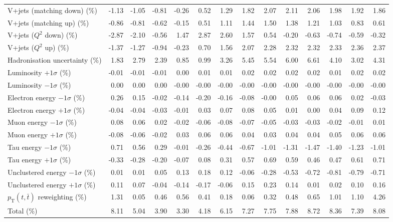 \begin{table}[htbp]
{\begin{tabular}{lrrrrrrrrrrrrr}
V+jets (matching down) (\%) & -1.13 & -1.05 & -0.81 & -0.26 & 0.52 & 1.29 & 1.82 & 2.07 & 2.11 & 2.06 & 1.98 & 1.92 & 1.86 \\ 
V+jets (matching up) (\%) & -0.86 & -0.81 & -0.62 & -0.15 & 0.51 & 1.11 & 1.44 & 1.50 & 1.38 & 1.21 & 1.03 & 0.83 & 0.61 \\ 
V+jets ($Q^{2}$ down) (\%) & -2.87 & -2.10 & -0.56 & 1.47 & 2.87 & 2.60 & 1.57 & 0.54 & -0.20 & -0.63 & -0.74 & -0.59 & -0.32 \\ 
V+jets ($Q^{2}$ up) (\%) & -1.37 & -1.27 & -0.94 & -0.23 & 0.70 & 1.56 & 2.07 & 2.28 & 2.32 & 2.32 & 2.33 & 2.36 & 2.37 \\ 
Hadronisation uncertainty (\%) & 1.83 & 2.79 & 2.39 & 0.85 & 0.99 & 3.26 & 5.45 & 5.54 & 6.00 & 6.61 & 4.10 & 3.02 & 4.31 \\ 
Luminosity $+1\sigma$ (\%) & -0.01 & -0.01 & -0.01 & 0.00 & 0.01 & 0.01 & 0.02 & 0.02 & 0.02 & 0.02 & 0.01 & 0.02 & 0.02 \\ 
Luminosity $-1\sigma$ (\%) & 0.00 & 0.00 & 0.00 & -0.00 & -0.00 & -0.00 & -0.00 & -0.00 & -0.00 & -0.00 & -0.00 & -0.00 & -0.00 \\ 
Electron energy $-1\sigma$ (\%) & 0.26 & 0.15 & -0.02 & -0.14 & -0.20 & -0.16 & -0.08 & -0.00 & 0.05 & 0.06 & 0.06 & 0.02 & -0.03 \\ 
Electron energy $+1\sigma$ (\%) & -0.04 & -0.04 & -0.03 & -0.01 & 0.03 & 0.07 & 0.08 & 0.05 & 0.01 & 0.00 & 0.04 & 0.09 & 0.12 \\ 
Muon energy $-1\sigma$ (\%) & 0.08 & 0.06 & 0.02 & -0.02 & -0.06 & -0.08 & -0.07 & -0.05 & -0.03 & -0.03 & -0.02 & -0.01 & 0.01 \\ 
Muon energy $+1\sigma$ (\%) & -0.08 & -0.06 & -0.02 & 0.03 & 0.06 & 0.06 & 0.04 & 0.03 & 0.04 & 0.04 & 0.05 & 0.06 & 0.06 \\ 
Tau energy $-1\sigma$ (\%) & 0.71 & 0.56 & 0.29 & -0.01 & -0.26 & -0.44 & -0.67 & -1.01 & -1.31 & -1.47 & -1.40 & -1.23 & -1.01 \\ 
Tau energy $+1\sigma$ (\%) & -0.33 & -0.28 & -0.20 & -0.07 & 0.08 & 0.31 & 0.57 & 0.69 & 0.59 & 0.46 & 0.47 & 0.61 & 0.71 \\ 
Unclustered energy $-1\sigma$ (\%) & 0.01 & 0.01 & 0.05 & 0.13 & 0.18 & 0.12 & -0.06 & -0.28 & -0.53 & -0.72 & -0.81 & -0.79 & -0.71 \\ 
Unclustered energy $+1\sigma$ (\%) & 0.11 & 0.07 & -0.04 & -0.14 & -0.17 & -0.06 & 0.15 & 0.23 & 0.14 & 0.01 & 0.02 & 0.10 & 0.16 \\ 
$p_\mathrm{T}(t,\bar{t})$ reweighting (\%) & 1.31 & 0.05 & 0.46 & 0.56 & 0.41 & 0.18 & 0.06 & 0.32 & 0.48 & 0.65 & 1.01 & 1.10 & 4.26 \\ 
\hline 
Total (\%) & 8.11  & 5.04  & 3.90  & 3.30  & 4.18  & 6.15  & 7.27  & 7.75  & 7.88  & 8.72  & 8.36  & 7.39  & 8.08 \\ 
\hline 
\end{tabular}
}
\end{table}
